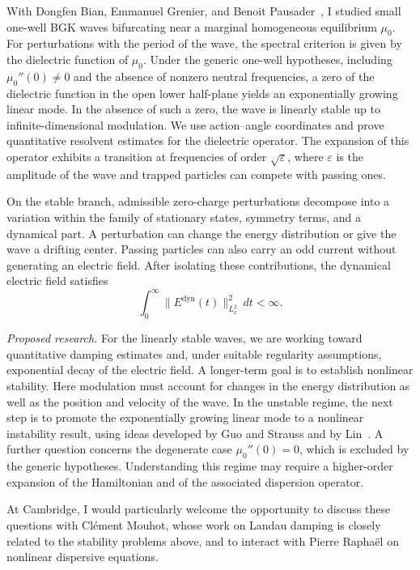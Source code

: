 \documentclass[reqno,10pt,a4paper]{amsart}
\numberwithin{equation}{section}
\begin{document}
With Dongfen Bian, Emmanuel Grenier, and Benoit Pausader~\cite{BGHP26}, I studied small one-well BGK waves bifurcating near a marginal homogeneous equilibrium $\mu_0$. For perturbations with the period of the wave, the spectral criterion is given by the dielectric function of $\mu_0$. Under the generic one-well hypotheses, including $\mu_0''(0)\ne0$ and the absence of nonzero neutral frequencies, a zero of the dielectric function in the open lower half-plane yields an exponentially growing linear mode. In the absence of such a zero, the wave is linearly stable up to infinite-dimensional modulation. We use action--angle coordinates and prove quantitative resolvent estimates for the dielectric operator. The expansion of this operator exhibits a transition at frequencies of order $\sqrt{\varepsilon}$, where $\varepsilon$ is the amplitude of the wave and trapped particles can compete with passing ones.

On the stable branch, admissible zero-charge perturbations decompose into a variation within the family of stationary states, symmetry terms, and a dynamical part. A perturbation can change the energy distribution or give the wave a drifting center. Passing particles can also carry an odd current without generating an electric field. After isolating these contributions, the dynamical electric field satisfies
\[
 \int_0^\infty\|E^{\mathrm{dyn}}(t)\|_{L_x^2}^2\,dt<\infty .
\]

\emph{Proposed research.} For the linearly stable waves, we are working toward quantitative damping estimates and, under suitable regularity assumptions, exponential decay of the electric field. A longer-term goal is to establish nonlinear stability. Here modulation must account for changes in the energy distribution as well as the position and velocity of the wave. In the unstable regime, the next step is to promote the exponentially growing linear mode to a nonlinear instability result, using ideas developed by Guo and Strauss and by Lin~\cite{GS95,L05}. A further question concerns the degenerate case $\mu_0''(0)=0$, which is excluded by the generic hypotheses. Understanding this regime may require a higher-order expansion of the Hamiltonian and of the associated dispersion operator.

At Cambridge, I would particularly welcome the opportunity to discuss these questions with Cl\'ement Mouhot, whose work on Landau damping is closely related to the stability problems above, and to interact with Pierre Rapha\"el on nonlinear dispersive equations.
\end{document}
